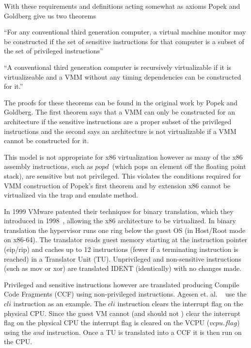 With these requirements and definitions acting somewhat as axioms Popek and Goldberg give us two theorems ~\cite{popek_formal_1974}



 \begin{theorem}
 \label{Popek I}
 {
 ``For any conventional third generation computer, a virtual machine monitor may be constructed if the set of sensitive instructions for that computer is a subset of the set of privileged instructions'' ~\cite{popek_formal_1974}
 }
 \end{theorem}


\begin{theorem}
 \label{Popek II}
 {
 ``A conventional third generation computer is recursively virtualizable if it is virtualizeable and a VMM without any timing dependencies can be constructed for it.'' ~\cite{popek_formal_1974}
 }
 \end{theorem}



The proofs for these theorems can be found in the original work by Popek and Goldberg. The first theorem says that a VMM can only be constructed for an architecture if the sensitive instructions are a proper subset of the privileged instructions and the second says an architecture is not virtualizable if a VMM cannot be constructed for it.  

This model is not appropriate for x86 virtualization however as many of the x86 assembly instructions, such as $popd$~\cite{_intel_2015}(which pops an element off the floating point stack),  are sensitive but not privileged. This violates the conditions required for VMM construction of Popek's first theorem and by extension x86 cannot be virtualized via the trap and emulate method. 

In 1999 VMware patented their techniques for binary translation, which they introduced in 1998~\cite{rosenblum_vmwareas_1999}, allowing the x86 architecture to be virtualized.  In binary translation the hypervisor runs one ring below the guest OS (in Host/Root mode on x86-64).  The translator reads guest memory starting at the instruction pointer (eip/rip) and caches up to 12 instructions (fewer if a terminating instruction is reached) in a Translator Unit (TU). Unprivileged and non-sensitive instructions (such as mov or xor) are translated IDENT (identically) with no changes made. 

Privileged and sensitive instructions however are translated producing Compile Code Fragments (CCF) using non-privileged instructions. Agesen et. al. ~\cite{agesen_evolution_2010} use the $cli$ instruction as an example. The $cli$ instruction clears the interrupt flag on the physical CPU. 
Since the guest VM cannot (and should not ) clear the interrupt flag on the physical CPU the interrupt flag is cleared on the VCPU ($vcpu.flag$) using the $and$ instruction. Once a TU is translated into a CCF it is then run on the CPU. 

